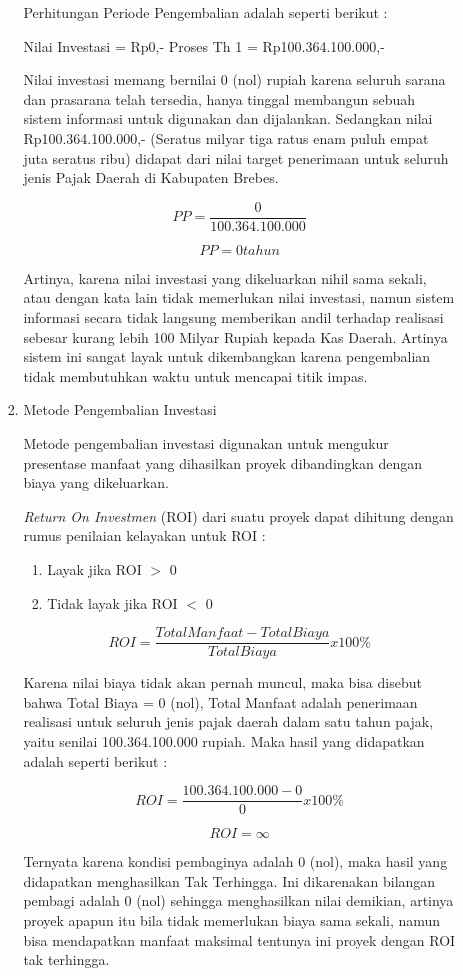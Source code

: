 \documentclass[pdftex,12pt, oneside]{article}
\begin{document}
\begin{enumerate}
\begin{enumerate}
\begin{enumerate}
Perhitungan Periode Pengembalian adalah seperti berikut :

Nilai Investasi = Rp0,-
Proses Th 1 = Rp100.364.100.000,-

Nilai investasi memang bernilai 0 (nol) rupiah karena seluruh sarana dan prasarana telah tersedia, hanya tinggal membangun sebuah sistem informasi untuk digunakan dan dijalankan. Sedangkan nilai Rp100.364.100.000,- (Seratus milyar tiga ratus enam puluh empat juta seratus ribu) didapat dari nilai target penerimaan untuk seluruh jenis Pajak Daerah di Kabupaten Brebes.

\[ PP = \frac{0}{100.364.100.000} \]

\[ PP = 0 tahun \]

Artinya, karena nilai investasi yang dikeluarkan nihil sama sekali, atau dengan kata lain tidak memerlukan nilai investasi, namun sistem informasi secara tidak langsung memberikan andil terhadap realisasi sebesar kurang lebih 100 Milyar Rupiah kepada Kas Daerah. Artinya sistem ini sangat layak untuk dikembangkan karena pengembalian tidak membutuhkan waktu untuk mencapai titik impas.
	
	\item Metode Pengembalian Investasi
	
Metode pengembalian investasi digunakan untuk mengukur presentase manfaat yang dihasilkan proyek dibandingkan dengan biaya yang dikeluarkan.

\textit{Return On Investmen} (ROI) dari suatu proyek dapat dihitung dengan rumus penilaian kelayakan untuk ROI :

\begin{enumerate}
	\item Layak jika ROI $>$ 0
	\item Tidak layak jika ROI $<$ 0
\end{enumerate}	

\[ ROI = \frac{Total Manfaat - Total Biaya}{Total Biaya} x 100\% \]
	
Karena nilai biaya tidak akan pernah muncul, maka bisa disebut bahwa Total Biaya = 0 (nol), Total Manfaat adalah penerimaan realisasi untuk seluruh jenis pajak daerah dalam satu tahun pajak, yaitu senilai 100.364.100.000 rupiah. Maka hasil yang didapatkan adalah seperti berikut :

\[ ROI = \frac{100.364.100.000 - 0}{0} x 100\% \]

\[ ROI = \infty \]

Ternyata karena kondisi pembaginya adalah 0 (nol), maka hasil yang didapatkan menghasilkan Tak Terhingga. Ini dikarenakan bilangan pembagi adalah 0 (nol) sehingga menghasilkan nilai demikian, artinya proyek apapun itu bila tidak memerlukan biaya sama sekali, namun bisa mendapatkan manfaat maksimal tentunya ini proyek dengan ROI tak terhingga.


\end{enumerate}
\end{enumerate}
\end{enumerate}
\end{document}
